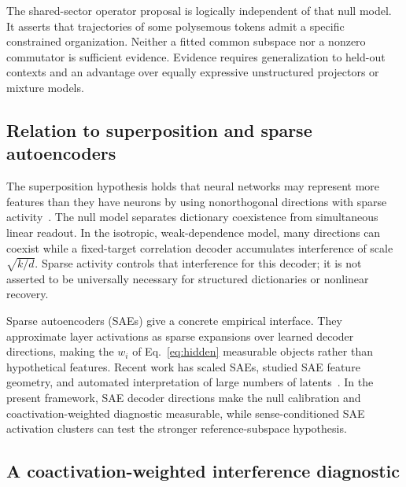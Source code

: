 \documentclass[
  aps,
  reprint,
  superscriptaddress,
  floatfix,
  nofootinbib,
  longbibliography
]{revtex4-2}
\begin{document}
The shared-sector operator proposal is logically independent of that null
model.  It asserts that trajectories of some polysemous tokens admit a
specific constrained organization.  Neither a fitted common subspace nor a
nonzero commutator is sufficient evidence.  Evidence requires generalization
to held-out contexts and an advantage over equally expressive unstructured
projectors or mixture models.

\subsection{Relation to superposition and sparse autoencoders}
\label{sec:superposition}

The superposition hypothesis holds that neural networks may represent more
features than they have neurons by using nonorthogonal directions with sparse
activity~\cite{elhage2022superposition,bricken2023monosemanticity}.  The null
model separates dictionary coexistence from simultaneous linear readout.  In
the isotropic, weak-dependence model, many directions can coexist while a
fixed-target correlation decoder accumulates interference of scale
$\sqrt{k/d}$.  Sparse activity controls that interference for this decoder;
it is not asserted to be universally necessary for structured dictionaries or
nonlinear recovery.

Sparse autoencoders (SAEs) give a concrete empirical interface. They
approximate layer activations as sparse expansions over learned decoder
directions, making the $w_i$ of Eq.~\eqref{eq:hidden} measurable
objects rather than hypothetical features. Recent work has scaled SAEs,
studied SAE feature geometry, and automated interpretation of large
numbers of latents~\cite{gao2025scaling,li2025geometry,paulo2025automatically,shu2025survey}. In the
present framework, SAE decoder directions make the null calibration and
coactivation-weighted diagnostic measurable, while sense-conditioned SAE
activation clusters can test the stronger reference-subspace hypothesis.

\subsection{A coactivation-weighted interference diagnostic}
\label{sec:coactivation-diagnostic}
\end{document}
